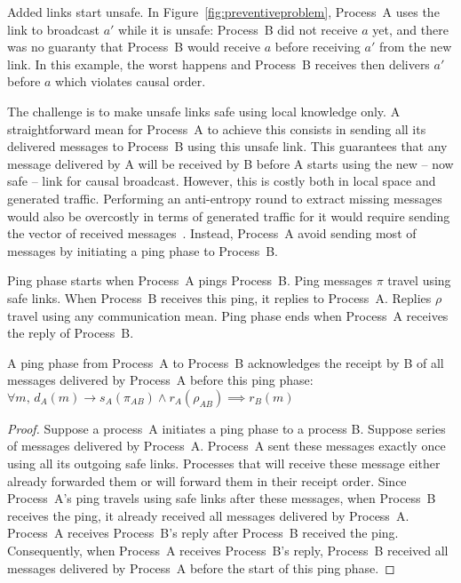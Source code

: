 Added links start unsafe. In Figure~\ref{fig:preventiveproblem}, Process~A uses
the link to broadcast $a'$ while it is unsafe: Process~B did not receive $a$
yet, and there was no guaranty that Process~B would receive $a$ before receiving
$a'$ from the new link. In this example, the worst happens and Process~B
receives then delivers $a'$ before $a$ which violates causal order.

The challenge is to make unsafe links safe using local knowledge only. A
straightforward mean for Process~A to achieve this consists in sending all its
delivered messages to Process~B using this unsafe link. This guarantees that any
message delivered by A will be received by B before A starts using the new --
now safe -- link for causal broadcast. However, this is costly both in local
space and generated traffic. Performing an anti-entropy round to extract missing
messages would also be overcostly in terms of generated traffic for it would
require sending the vector of received messages~\cite{demers1987epidemic}.
Instead, Process~A avoid sending most of messages by initiating a ping phase
to Process~B. %

\begin{definition}
  Ping phase starts when Process~A pings Process~B. Ping messages $\pi$ travel
  using safe links. When Process~B receives this ping, it replies to
  Process~A. Replies $\rho$ travel using any communication mean. Ping phase ends
  when Process~A receives the reply of Process~B.
\end{definition}

\begin{lemma}
  A ping phase from Process~A to Process~B acknowledges the receipt by B of all
  messages delivered by Process~A before this ping phase:
  $\forall m,\, d_A(m) \rightarrow s_A(\pi_{AB}) \wedge r_A(\rho_{AB}) \implies
  r_B(m)$
\end{lemma}

\begin{proof}
  Suppose a process~A initiates a ping phase to a process B. Suppose series of
  messages delivered by Process~A. Process~A sent these messages exactly once
  using all its outgoing safe links. Processes that will receive these message
  either already forwarded them or will forward them in their receipt
  order. Since Process~A's ping travels using safe links after these messages,
  when Process~B receives the ping, it already received all messages delivered
  by Process~A. Process~A receives Process~B's reply after Process~B received
  the ping. Consequently, when Process~A receives Process~B's reply, Process~B
  received all messages delivered by Process~A before the start of this ping
  phase.
\end{proof}

